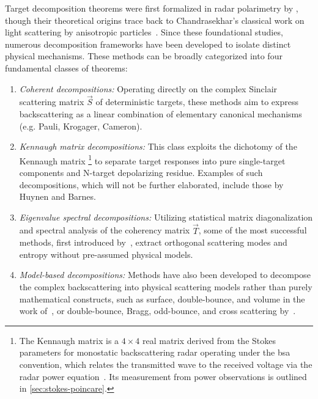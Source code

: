 Target decomposition theorems were first formalized in radar polarimetry by \textcite{huynenPhenomenologicalTheoryRadar1970}, though their theoretical origins trace back to Chandrasekhar's classical work on light scattering by anisotropic particles~\parencite{chandrasekharRadiativeTransfer1960}.
Since these foundational studies, numerous decomposition frameworks have been developed to isolate distinct physical mechanisms.
These methods can be broadly categorized into four fundamental classes of theorems:
\begin{enumerate}
    \item \textit{Coherent decompositions:} Operating directly on the complex Sinclair scattering matrix $\vec S$ of deterministic targets, these methods aim to express backscattering as a linear combination of elementary canonical mechanisms (e.g. Pauli, Krogager, Cameron).
    \item \textit{Kennaugh matrix decompositions:} This class exploits the dichotomy of the Kennaugh matrix
        \footnote{The Kennaugh matrix is a $4 \times 4$ real matrix derived from the Stokes parameters for monostatic backscattering radar operating under the \gls{bsa} convention, which relates the transmitted wave to the received voltage via the radar power equation~\parencite{guissardMuellerKennaughMatrices1994}.
        Its measurement from power observations is outlined in \cref{sec:stokes-poincare}.}
    to separate target responses into pure single-target components and N-target depolarizing residue.
    Examples of such decompositions, which will not be further elaborated, include those by Huynen and Barnes.
    \item \textit{Eigenvalue spectral decompositions:} Utilizing statistical matrix diagonalization and spectral analysis of the coherency matrix $\vec T$, some of the most successful methods, first introduced by~\textcite{cloudeConceptPolarizationEntropy1995}, extract orthogonal scattering modes and entropy without pre-assumed physical models.
    \item \textit{Model-based decompositions:} Methods have also been developed to decompose the complex backscattering into physical scattering models rather than purely mathematical constructs, such as surface, double-bounce, and volume in the work of~\textcite{freemanThreecomponentScatteringModel1998}, or double-bounce, Bragg, odd-bounce, and cross scattering by~\textcite{dongPolarimetricImageClassification1996}.
\end{enumerate}

